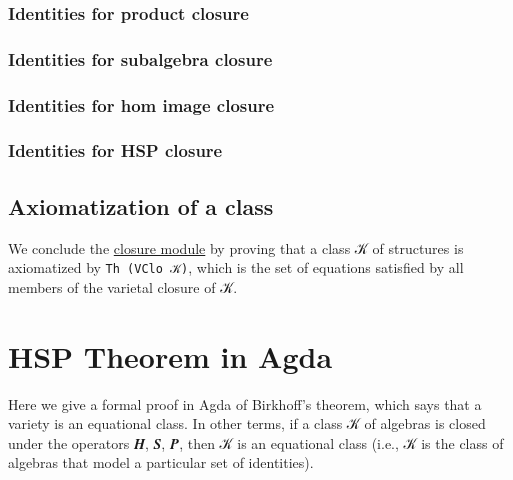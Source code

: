 \documentclass[sigplan,screen]{acmart}
\newcommand\closuremodule{\href{https://gitlab.com/ualib/ualib.gitlab.io/-/blob/master/congruences.lagda.rst}{closure module}\xspace}
\begin{document}
\subsubsection{Identities for product closure}\label{identities-for-product-closure}
\begin{code}\end{code}


\subsubsection{Identities for subalgebra closure}\label{identities-for-subalgebra-closure}
\begin{code}\end{code}

\subsubsection{Identities for hom image closure}\label{identities-for-hom-image-closure}
\begin{code}\end{code}

\subsubsection{Identities for HSP closure}\label{identities-for-hsp-closure}
\begin{code}\end{code}


\subsection{Axiomatization of a class}\label{axiomatization-of-a-class}
We conclude the \closuremodule by proving that a class 𝒦 of structures is axiomatized by \texttt{Th\ (VClo\ 𝒦)}, which is the set of equations satisfied by all members of the varietal closure of 𝒦.
\begin{code}\end{code}


\section{HSP Theorem in Agda}\label{hsp-theorem-in-agda}
Here we give a formal proof in Agda of Birkhoff's theorem, which says that a variety is an equational class. In other terms, if a class 𝒦 of algebras is closed under the operators 𝑯, 𝑺, 𝑷, then 𝒦 is an equational class (i.e., 𝒦 is the class of algebras that model a particular set of identities).
\end{document}
